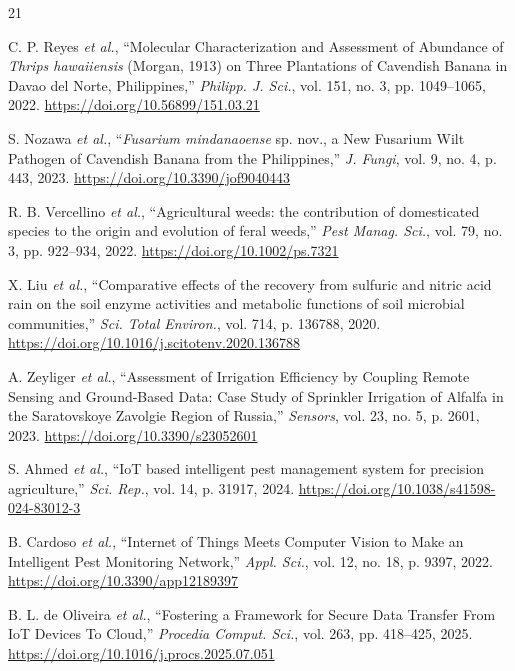 \documentclass[conference]{IEEEtran}
\begin{document}
\begin{thebibliography}{21}

 C. P. Reyes \textit{et al.}, ``Molecular Characterization and Assessment of Abundance of \textit{Thrips hawaiiensis} (Morgan, 1913) on Three Plantations of Cavendish Banana in Davao del Norte, Philippines,'' \textit{Philipp. J. Sci.}, vol. 151, no. 3, pp. 1049--1065, 2022. \url{https://doi.org/10.56899/151.03.21}

 S. Nozawa \textit{et al.}, ``\textit{Fusarium mindanaoense} sp. nov., a New Fusarium Wilt Pathogen of Cavendish Banana from the Philippines,'' \textit{J. Fungi}, vol. 9, no. 4, p. 443, 2023. \url{https://doi.org/10.3390/jof9040443}

 R. B. Vercellino \textit{et al.}, ``Agricultural weeds: the contribution of domesticated species to the origin and evolution of feral weeds,'' \textit{Pest Manag. Sci.}, vol. 79, no. 3, pp. 922--934, 2022. \url{https://doi.org/10.1002/ps.7321}

 X. Liu \textit{et al.}, ``Comparative effects of the recovery from sulfuric and nitric acid rain on the soil enzyme activities and metabolic functions of soil microbial communities,'' \textit{Sci. Total Environ.}, vol. 714, p. 136788, 2020. \url{https://doi.org/10.1016/j.scitotenv.2020.136788}

 A. Zeyliger \textit{et al.}, ``Assessment of Irrigation Efficiency by Coupling Remote Sensing and Ground-Based Data: Case Study of Sprinkler Irrigation of Alfalfa in the Saratovskoye Zavolgie Region of Russia,'' \textit{Sensors}, vol. 23, no. 5, p. 2601, 2023. \url{https://doi.org/10.3390/s23052601}

 S. Ahmed \textit{et al.}, ``IoT based intelligent pest management system for precision agriculture,'' \textit{Sci. Rep.}, vol. 14, p. 31917, 2024. \url{https://doi.org/10.1038/s41598-024-83012-3}

 B. Cardoso \textit{et al.}, ``Internet of Things Meets Computer Vision to Make an Intelligent Pest Monitoring Network,'' \textit{Appl. Sci.}, vol. 12, no. 18, p. 9397, 2022. \url{https://doi.org/10.3390/app12189397}

 B. L. de Oliveira \textit{et al.}, ``Fostering a Framework for Secure Data Transfer From IoT Devices To Cloud,'' \textit{Procedia Comput. Sci.}, vol. 263, pp. 418--425, 2025. \url{https://doi.org/10.1016/j.procs.2025.07.051}


\end{thebibliography}
\end{document}
